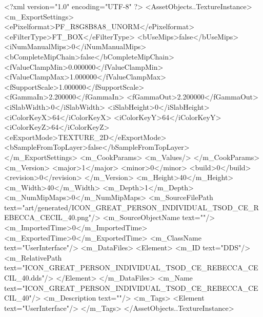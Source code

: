 <?xml version="1.0" encoding="UTF-8" ?>
<AssetObjects..TextureInstance>
	<m_ExportSettings>
		<ePixelformat>PF_R8G8B8A8_UNORM</ePixelformat>
		<eFilterType>FT_BOX</eFilterType>
		<bUseMips>false</bUseMips>
		<iNumManualMips>0</iNumManualMips>
		<bCompleteMipChain>false</bCompleteMipChain>
		<fValueClampMin>0.000000</fValueClampMin>
		<fValueClampMax>1.000000</fValueClampMax>
		<fSupportScale>1.000000</fSupportScale>
		<fGammaIn>2.200000</fGammaIn>
		<fGammaOut>2.200000</fGammaOut>
		<iSlabWidth>0</iSlabWidth>
		<iSlabHeight>0</iSlabHeight>
		<iColorKeyX>64</iColorKeyX>
		<iColorKeyY>64</iColorKeyY>
		<iColorKeyZ>64</iColorKeyZ>
		<eExportMode>TEXTURE_2D</eExportMode>
		<bSampleFromTopLayer>false</bSampleFromTopLayer>
	</m_ExportSettings>
	<m_CookParams>
		<m_Values/>
	</m_CookParams>
	<m_Version>
		<major>1</major>
		<minor>0</minor>
		<build>0</build>
		<revision>0</revision>
	</m_Version>
	<m_Height>40</m_Height>
	<m_Width>40</m_Width>
	<m_Depth>1</m_Depth>
	<m_NumMipMaps>0</m_NumMipMaps>
	<m_SourceFilePath text="art/generated/ICON_GREAT_PERSON_INDIVIDUAL_TSOD_CE_REBECCA_CECIL_40.png"/>
	<m_SourceObjectName text=""/>
	<m_ImportedTime>0</m_ImportedTime>
	<m_ExportedTime>0</m_ExportedTime>
	<m_ClassName text="UserInterface"/>
	<m_DataFiles>
		<Element>
			<m_ID text="DDS"/>
			<m_RelativePath text="ICON_GREAT_PERSON_INDIVIDUAL_TSOD_CE_REBECCA_CECIL_40.dds"/>
		</Element>
	</m_DataFiles>
	<m_Name text="ICON_GREAT_PERSON_INDIVIDUAL_TSOD_CE_REBECCA_CECIL_40"/>
	<m_Description text=""/>
	<m_Tags>
		<Element text="UserInterface"/>
	</m_Tags>
</AssetObjects..TextureInstance>
